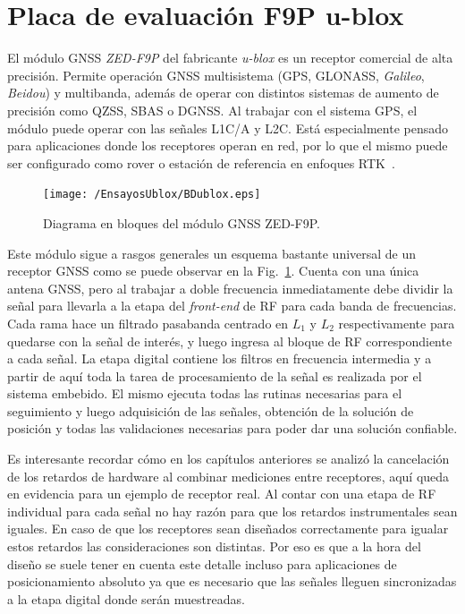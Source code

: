 \documentclass[a4paper,12pt,oneside,onecolumn,final,openright]{book}%
\begin{document}
\section{Placa de evaluación F9P u-blox}
	El módulo GNSS \textit{ZED-F9P} del fabricante \textit{u-blox} es un receptor comercial de alta precisión. Permite operación GNSS multisistema (GPS, GLONASS, \textit{Galileo}, \textit{Beidou}) y multibanda, además de operar con distintos sistemas de aumento de precisión como QZSS, SBAS o DGNSS. Al trabajar con el sistema GPS, el módulo puede operar con las señales L1C/A y L2C. Está especialmente pensado para aplicaciones donde los receptores operan en red, por lo que el mismo puede ser configurado como rover o estación de referencia en enfoques RTK~\cite{ZEDds}.

\begin{figure}
    \centering
    \texttt{[image: /EnsayosUblox/BDublox.eps]}
    \caption{Diagrama en bloques del módulo GNSS ZED-F9P.}
    \label{fig:BDublox}
\end{figure}
	Este módulo sigue a rasgos generales un esquema bastante universal de un receptor GNSS como se puede observar en la Fig.~\ref{fig:BDublox}. Cuenta con una única antena GNSS, pero al trabajar a doble frecuencia inmediatamente debe dividir la señal para llevarla a la etapa del \textit{front-end} de RF para cada banda de frecuencias. Cada rama hace un filtrado pasabanda centrado en $L_1$ y $L_2$ respectivamente para quedarse con la señal de interés, y luego ingresa al bloque de RF correspondiente a cada señal. La etapa digital contiene los filtros en frecuencia intermedia y a partir de aquí toda la tarea de procesamiento de la señal es realizada por el sistema embebido. El mismo ejecuta todas las rutinas necesarias para el seguimiento y luego adquisición de las señales, obtención de la solución de posición y todas las validaciones necesarias para poder dar una solución confiable.
	
	Es interesante recordar cómo en los capítulos anteriores se analizó la cancelación de los retardos de hardware al combinar mediciones entre receptores, aquí queda en evidencia para un ejemplo de receptor real. Al contar con una etapa de RF individual para cada señal no hay razón para que los retardos instrumentales sean iguales. En caso de que los receptores sean diseñados correctamente para igualar estos retardos las consideraciones son distintas. Por eso es que a la hora del diseño se suele tener en cuenta este detalle incluso para aplicaciones de posicionamiento absoluto ya que es necesario que las señales lleguen sincronizadas a la etapa digital donde serán muestreadas. 
	
\end{document}

